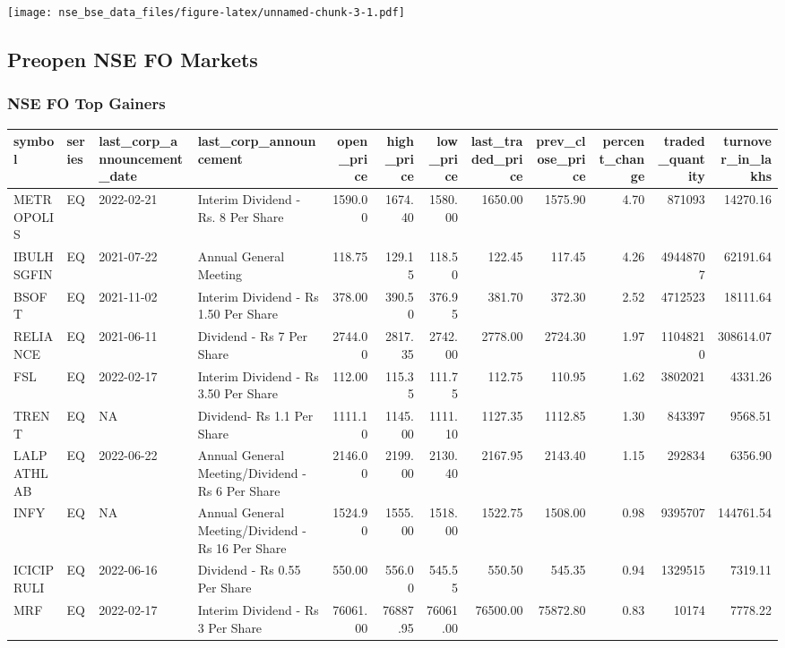 \documentclass[
]{article}
\begin{document}
\texttt{[image: nse\_bse\_data\_files/figure-latex/unnamed-chunk-3-1.pdf]}

\hypertarget{preopen-nse-fo-markets}{%
\subsection{Preopen NSE FO Markets}\label{preopen-nse-fo-markets}}

\hypertarget{nse-fo-top-gainers}{%
\subsubsection{\texorpdfstring{ NSE FO Top
Gainers}{ NSE FO Top Gainers}}\label{nse-fo-top-gainers}}

\begin{table}
\centering\begingroup\fontsize{12}{14}\selectfont

\begin{tabular}{l|l|l|l|r|r|r|r|r|r|r|r}
\hline
symbol & series & last\_corp\_announcement\_date & last\_corp\_announcement & open\_price & high\_price & low\_price & last\_traded\_price & prev\_close\_price & percent\_change & traded\_quantity & turnover\_in\_lakhs\\
\hline
METROPOLIS & EQ & 2022-02-21 & Interim Dividend - Rs. 8 Per Share & 1590.00 & 1674.40 & 1580.00 & 1650.00 & 1575.90 & 4.70 & 871093 & 14270.16\\
\hline
IBULHSGFIN & EQ & 2021-07-22 & Annual General Meeting & 118.75 & 129.15 & 118.50 & 122.45 & 117.45 & 4.26 & 49448707 & 62191.64\\
\hline
BSOFT & EQ & 2021-11-02 & Interim Dividend - Rs 1.50 Per Share & 378.00 & 390.50 & 376.95 & 381.70 & 372.30 & 2.52 & 4712523 & 18111.64\\
\hline
RELIANCE & EQ & 2021-06-11 & Dividend - Rs 7 Per Share & 2744.00 & 2817.35 & 2742.00 & 2778.00 & 2724.30 & 1.97 & 11048210 & 308614.07\\
\hline
FSL & EQ & 2022-02-17 & Interim Dividend - Rs 3.50 Per Share & 112.00 & 115.35 & 111.75 & 112.75 & 110.95 & 1.62 & 3802021 & 4331.26\\
\hline
TRENT & EQ & NA & Dividend- Rs 1.1 Per Share & 1111.10 & 1145.00 & 1111.10 & 1127.35 & 1112.85 & 1.30 & 843397 & 9568.51\\
\hline
LALPATHLAB & EQ & 2022-06-22 & Annual General Meeting/Dividend - Rs 6 Per Share & 2146.00 & 2199.00 & 2130.40 & 2167.95 & 2143.40 & 1.15 & 292834 & 6356.90\\
\hline
INFY & EQ & NA & Annual General Meeting/Dividend - Rs 16 Per Share & 1524.90 & 1555.00 & 1518.00 & 1522.75 & 1508.00 & 0.98 & 9395707 & 144761.54\\
\hline
ICICIPRULI & EQ & 2022-06-16 & Dividend - Rs 0.55 Per Share & 550.00 & 556.00 & 545.55 & 550.50 & 545.35 & 0.94 & 1329515 & 7319.11\\
\hline
MRF & EQ & 2022-02-17 & Interim Dividend - Rs 3 Per Share & 76061.00 & 76887.95 & 76061.00 & 76500.00 & 75872.80 & 0.83 & 10174 & 7778.22\\
\hline
\end{tabular}
\endgroup{}
\end{table}
\end{document}
